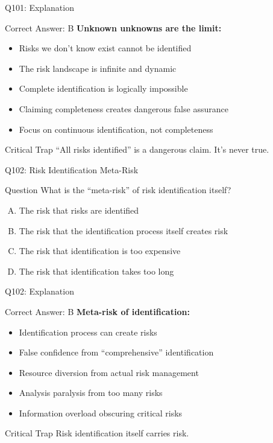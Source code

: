 \documentclass{beamer}
\begin{document}
	\begin{frame}{Q101: Explanation}
		\begin{block}{Correct Answer: B}
			\textbf{Unknown unknowns are the limit:}
			\begin{itemize}
				\item Risks we don't know exist cannot be identified
				\item The risk landscape is infinite and dynamic
				\item Complete identification is logically impossible
				\item Claiming completeness creates dangerous false assurance
				\item Focus on continuous identification, not completeness
			\end{itemize}
		\end{block}
		\begin{alertblock}{Critical Trap}
			``All risks identified'' is a dangerous claim. It's never true.
		\end{alertblock}
	\end{frame}
	
	\begin{frame}{Q102: Risk Identification Meta-Risk}
		\begin{block}{Question}
			What is the ``meta-risk'' of risk identification itself?
		\end{block}
		\begin{enumerate}[(A)]
			\item The risk that risks are identified
			\item The risk that the identification process itself creates risk
			\item The risk that identification is too expensive
			\item The risk that identification takes too long
		\end{enumerate}
	\end{frame}
	
	\begin{frame}{Q102: Explanation}
		\begin{block}{Correct Answer: B}
			\textbf{Meta-risk of identification:}
			\begin{itemize}
				\item Identification process can create risks
				\item False confidence from ``comprehensive'' identification
				\item Resource diversion from actual risk management
				\item Analysis paralysis from too many risks
				\item Information overload obscuring critical risks
			\end{itemize}
		\end{block}
		\begin{alertblock}{Critical Trap}
			Risk identification itself carries risk.
		\end{alertblock}
	\end{frame}
	
\end{document}
